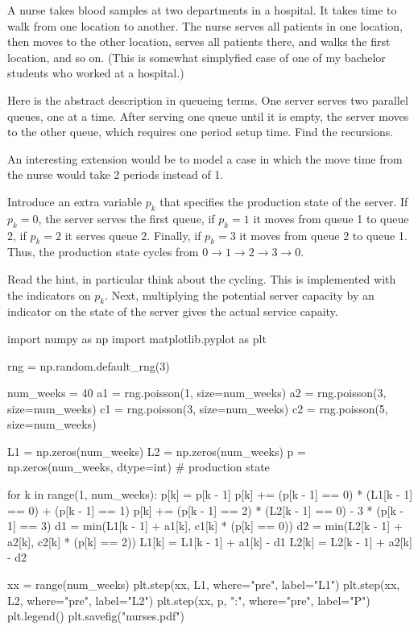 \documentclass[queueing-book.tex]{subfiles}
\begin{document}
\begin{exercise}
A nurse
takes blood samples at two departments in a hospital.
It takes time to walk from one location to another.
The nurse serves all patients in one location, then moves to the other location, serves all patients there, and walks the first location, and so on.
(This is somewhat simplyfied  case of one of my bachelor students who worked at a hospital.)

Here is the abstract description in queueing terms.
One server serves two parallel queues, one at a time.
After serving one queue until it is empty, the server moves to the other queue, which requires one period setup time.
Find the recursions.

An interesting extension would be to model a case in which the move time from the nurse would take 2 periods instead of 1.
\begin{hint}
Introduce an extra variable $p_k$ that specifies the production state of the server.
If $p_k=0$, the server serves the first queue, if $p_k=1$ it moves from queue 1 to queue 2, if $p_k=2$ it serves queue 2.
Finally, if $p_k=3$ it moves from queue 2 to queue 1. Thus, the production state cycles from $0\to 1\to 2\to 3 \to 0$.
\end{hint}
\begin{solution}
Read the hint, in particular think about the cycling.
This is implemented with the indicators on $p_{k}$.
Next, multiplying the potential server capacity by an indicator on the state of the server gives the actual service capaity.
\begin{python}
import numpy as np
import matplotlib.pyplot as plt


rng = np.random.default_rng(3)

num_weeks = 40
a1 = rng.poisson(1, size=num_weeks)
a2 = rng.poisson(3, size=num_weeks)
c1 = rng.poisson(3, size=num_weeks)
c2 = rng.poisson(5, size=num_weeks)

L1 = np.zeros(num_weeks)
L2 = np.zeros(num_weeks)
p = np.zeros(num_weeks, dtype=int)  # production state

for k in range(1, num_weeks):
    p[k] = p[k - 1]
    p[k] += (p[k - 1] == 0) * (L1[k - 1] == 0) + (p[k - 1] == 1)
    p[k] += (p[k - 1] == 2) * (L2[k - 1] == 0) - 3 * (p[k - 1] == 3)
    d1 = min(L1[k - 1] + a1[k], c1[k] * (p[k] == 0))
    d2 = min(L2[k - 1] + a2[k], c2[k] * (p[k] == 2))
    L1[k] = L1[k - 1] + a1[k] - d1
    L2[k] = L2[k - 1] + a2[k] - d2

xx = range(num_weeks)
plt.step(xx, L1, where="pre", label="L1")
plt.step(xx, L2, where="pre", label="L2")
plt.step(xx, p, ":", where="pre", label="P")
plt.legend()
plt.savefig("nurses.pdf")
\end{python}
\end{solution}
\end{exercise}



\end{document}
